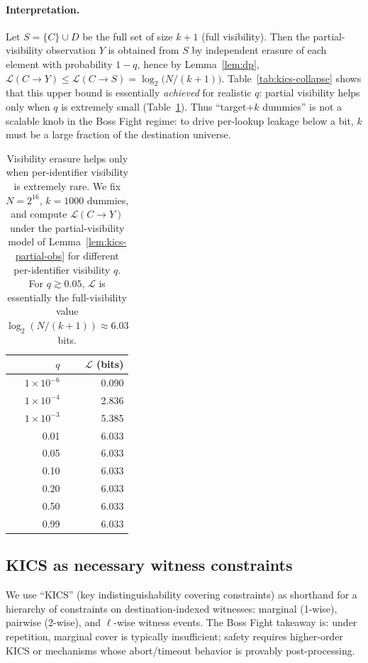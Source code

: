 \documentclass[11pt]{article}
\newcommand{\MaxL}{\mathcal{L}}
\newcommand{\logtwo}{\log_2}
\begin{document}
\paragraph{Interpretation.}
Let $S=\{C\}\cup D$ be the full set of size $k{+}1$ (full visibility).
Then the partial-visibility observation $Y$ is obtained from $S$ by independent erasure of each element with probability $1-q$, hence by Lemma~\ref{lem:dp},
$\MaxL(C\!\to\!Y)\le \MaxL(C\!\to\!S)=\logtwo\!\big(N/(k{+}1)\big)$.
Table~\ref{tab:kics-collapse} shows that this upper bound is essentially \emph{achieved} for realistic $q$:
partial visibility helps only when $q$ is extremely small (Table~\ref{tab:visibility-sweep}).
Thus ``target+$k$ dummies'' is not a scalable knob in the Boss Fight regime: to drive per-lookup leakage below a bit, $k$ must be a large fraction of the destination universe.


\begin{table}[t]
\centering
\caption{Visibility erasure helps only when per-identifier visibility is extremely rare. We fix $N=2^{16}$, $k=1000$ dummies, and compute $\MaxL(C\!\to\!Y)$ under the partial-visibility model of Lemma~\ref{lem:kics-partial-obs} for different per-identifier visibility $q$. For $q\gtrsim 0.05$, $\MaxL$ is essentially the full-visibility value $\logtwo(N/(k{+}1))\approx 6.03$ bits.}
\label{tab:visibility-sweep}
\begin{tabular}{r r}
\toprule
$q$ & $\MaxL$ (bits)\\
\midrule
$1\times 10^{-6}$ & 0.090\\
$1\times 10^{-4}$ & 2.836\\
$1\times 10^{-3}$ & 5.385\\
0.01 & 6.033\\
0.05 & 6.033\\
0.10 & 6.033\\
0.20 & 6.033\\
0.50 & 6.033\\
0.99 & 6.033\\
\bottomrule
\end{tabular}
\end{table}

\subsection{KICS as necessary witness constraints}
We use ``KICS'' (key indistinguishability covering constraints) as shorthand for a hierarchy of constraints on destination-indexed witnesses:
marginal (1-wise), pairwise (2-wise), and $\ell$-wise witness events.
The Boss Fight takeaway is: under repetition, marginal cover is typically insufficient; safety requires higher-order KICS or mechanisms whose abort/timeout behavior is provably post-processing.
\end{document}

